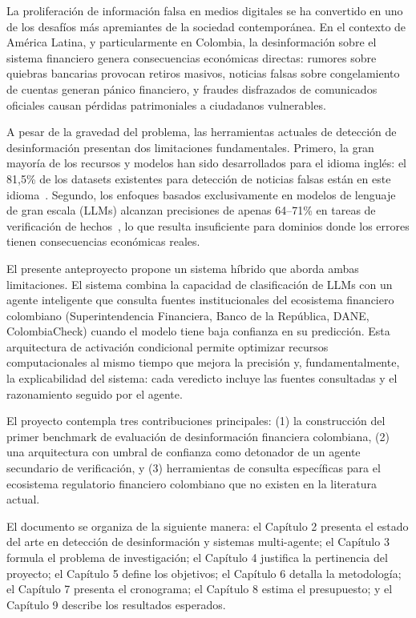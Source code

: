 La proliferación de información falsa en medios digitales se ha convertido en uno de los desafíos más apremiantes de la sociedad contemporánea. En el contexto de América Latina, y particularmente en Colombia, la desinformación sobre el sistema financiero genera consecuencias económicas directas: rumores sobre quiebras bancarias provocan retiros masivos, noticias falsas sobre congelamiento de cuentas generan pánico financiero, y fraudes disfrazados de comunicados oficiales causan pérdidas patrimoniales a ciudadanos vulnerables.

A pesar de la gravedad del problema, las herramientas actuales de detección de desinformación presentan dos limitaciones fundamentales. Primero, la gran mayoría de los recursos y modelos han sido desarrollados para el idioma inglés: el 81,5\% de los datasets existentes para detección de noticias falsas están en este idioma~\cite{Oshikawa2020}. Segundo, los enfoques basados exclusivamente en modelos de lenguaje de gran escala (LLMs) alcanzan precisiones de apenas 64--71\% en tareas de verificación de hechos~\cite{Hoes2023}, lo que resulta insuficiente para dominios donde los errores tienen consecuencias económicas reales.

El presente anteproyecto propone un sistema híbrido que aborda ambas limitaciones. El sistema combina la capacidad de clasificación de LLMs con un agente inteligente que consulta fuentes institucionales del ecosistema financiero colombiano (Superintendencia Financiera, Banco de la República, DANE, ColombiaCheck) cuando el modelo tiene baja confianza en su predicción. Esta arquitectura de activación condicional permite optimizar recursos computacionales al mismo tiempo que mejora la precisión y, fundamentalmente, la explicabilidad del sistema: cada veredicto incluye las fuentes consultadas y el razonamiento seguido por el agente.

El proyecto contempla tres contribuciones principales: (1) la construcción del primer benchmark de evaluación de desinformación financiera colombiana, (2) una arquitectura con umbral de confianza como detonador de un agente secundario de verificación, y (3) herramientas de consulta específicas para el ecosistema regulatorio financiero colombiano que no existen en la literatura actual.

El documento se organiza de la siguiente manera: el Capítulo 2 presenta el estado del arte en detección de desinformación y sistemas multi-agente; el Capítulo 3 formula el problema de investigación; el Capítulo 4 justifica la pertinencia del proyecto; el Capítulo 5 define los objetivos; el Capítulo 6 detalla la metodología; el Capítulo 7 presenta el cronograma; el Capítulo 8 estima el presupuesto; y el Capítulo 9 describe los resultados esperados.
